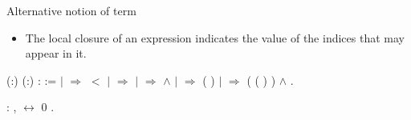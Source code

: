 \documentclass[10pt]{beamer}
\begin{document}
\begin{frame}[fragile]{Alternative notion of term}
  \begin{itemize}
  \item The local closure of an expression indicates the value of the
    indices that may appear in it.
  \end{itemize}
  \begin{coqdoccode}
     
    (:) (:)
    :  :=\coqdoceol \coqdocindent{1.00em}
      \coqdoceol
    \coqdocindent{1.00em} \ensuremath{|} 
     \ensuremath{\Rightarrow}   \ensuremath{<}
    \coqdoceol \coqdocindent{1.00em} \ensuremath{|}
      \ensuremath{\Rightarrow}
    \coqdoceol \coqdocindent{1.00em} \ensuremath{|}
      
    \ensuremath{\Rightarrow}  
     \ensuremath{\land}  
    \coqdoceol \coqdocindent{1.00em} \ensuremath{|}
      \ensuremath{\Rightarrow}
     ( )
    \coqdoceol \coqdocindent{1.00em} \ensuremath{|}
      
    \ensuremath{\Rightarrow} ( (
    ) ) \ensuremath{\land}
      \coqdoceol
    \coqdocindent{1.00em} .\coqdoceol
  \end{coqdoccode}

  \begin{coqdoccode}
   :
  \coqdockw{\ensuremath{\forall}} , 
   \ensuremath{\leftrightarrow}  0
  .\coqdoceol
\end{coqdoccode}
\end{frame}
\end{document}
